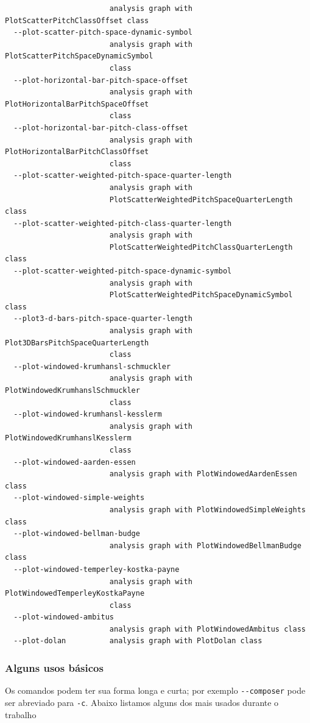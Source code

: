 \begin{verbatim}
                        analysis graph with PlotScatterPitchClassOffset class
  --plot-scatter-pitch-space-dynamic-symbol
                        analysis graph with PlotScatterPitchSpaceDynamicSymbol
                        class
  --plot-horizontal-bar-pitch-space-offset
                        analysis graph with PlotHorizontalBarPitchSpaceOffset
                        class
  --plot-horizontal-bar-pitch-class-offset
                        analysis graph with PlotHorizontalBarPitchClassOffset
                        class
  --plot-scatter-weighted-pitch-space-quarter-length
                        analysis graph with
                        PlotScatterWeightedPitchSpaceQuarterLength class
  --plot-scatter-weighted-pitch-class-quarter-length
                        analysis graph with
                        PlotScatterWeightedPitchClassQuarterLength class
  --plot-scatter-weighted-pitch-space-dynamic-symbol
                        analysis graph with
                        PlotScatterWeightedPitchSpaceDynamicSymbol class
  --plot3-d-bars-pitch-space-quarter-length
                        analysis graph with Plot3DBarsPitchSpaceQuarterLength
                        class
  --plot-windowed-krumhansl-schmuckler
                        analysis graph with PlotWindowedKrumhanslSchmuckler
                        class
  --plot-windowed-krumhansl-kesslerm
                        analysis graph with PlotWindowedKrumhanslKesslerm
                        class
  --plot-windowed-aarden-essen
                        analysis graph with PlotWindowedAardenEssen class
  --plot-windowed-simple-weights
                        analysis graph with PlotWindowedSimpleWeights class
  --plot-windowed-bellman-budge
                        analysis graph with PlotWindowedBellmanBudge class
  --plot-windowed-temperley-kostka-payne
                        analysis graph with PlotWindowedTemperleyKostkaPayne
                        class
  --plot-windowed-ambitus
                        analysis graph with PlotWindowedAmbitus class
  --plot-dolan          analysis graph with PlotDolan class
\end{verbatim}

\subsubsection*{Alguns usos básicos}

Os comandos podem ter sua forma longa e curta; por exemplo \verb|--composer| pode ser abreviado para \verb|-c|. Abaixo listamos alguns dos mais usados durante o trabalho

